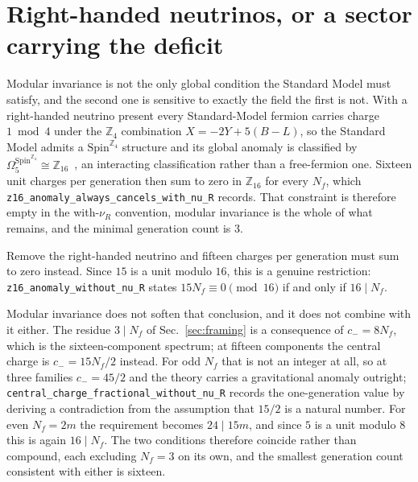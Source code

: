 \documentclass[aps,prl,twocolumn,superscriptaddress,nofootinbib]{revtex4-2}
\begin{document}
\section{Right-handed neutrinos, or a sector carrying the deficit}
\label{sec:nur}

Modular invariance is not the only global condition the Standard Model
must satisfy, and the second one is sensitive to exactly the field the
first is not. With a right-handed neutrino present every Standard-Model
fermion carries charge $1 \bmod 4$ under the $\mathbb{Z}_4$ combination
$X = -2Y + 5(B-L)$, so the Standard Model admits a
$\mathrm{Spin}^{\mathbb{Z}_4}$ structure and its global anomaly is
classified by $\Omega_5^{\mathrm{Spin}^{\mathbb{Z}_4}} \cong
\mathbb{Z}_{16}$~\cite[Sec.~4.3]{GarciaEtxebarria2019}, an interacting
classification rather than a free-fermion one. Sixteen unit charges per
generation then sum to zero
in $\mathbb{Z}_{16}$ for every $N_f$, which
\texttt{z16\_anomaly\_always\_cancels\_with\_nu\_R} records. That
constraint is therefore empty in the with-$\nu_R$ convention, modular
invariance is the whole of what remains, and the minimal generation
count is $3$.

Remove the right-handed neutrino and fifteen charges per generation
must sum to zero instead. Since $15$ is a unit modulo $16$, this is a
genuine restriction: \texttt{z16\_anomaly\_without\_nu\_R} states
$15 N_f \equiv 0 \pmod{16}$ if and only if $16 \mid N_f$.

Modular invariance does not soften that conclusion, and it does not
combine with it either. The residue $3 \mid N_f$ of
Sec.~\ref{sec:framing} is a consequence of $c_- = 8 N_f$, which is the
sixteen-component spectrum; at fifteen components the central charge is
$c_- = 15 N_f/2$ instead. For odd $N_f$ that is not an integer at all,
so at three families $c_- = 45/2$ and the theory carries a
gravitational anomaly outright;
\texttt{central\_charge\_fractional\_without\_nu\_R} records the
one-generation value by deriving a contradiction from the assumption
that $15/2$ is a natural number. For even $N_f = 2m$ the requirement
becomes $24 \mid 15 m$, and since $5$ is a unit modulo $8$ this is
again $16 \mid N_f$. The two conditions therefore coincide rather than
compound, each excluding $N_f = 3$ on its own, and the smallest
generation count consistent with either is sixteen.
\end{document}
